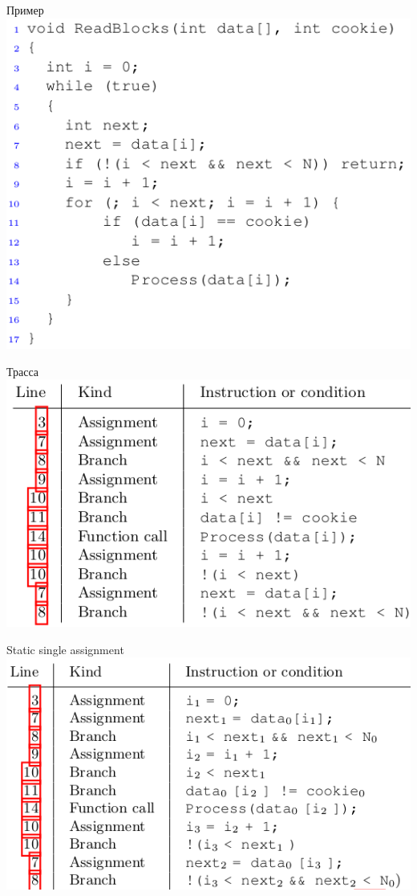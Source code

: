\documentclass{beamer}
\begin{document}
\begin{frame}{Пример}
\includegraphics[scale=0.5]{example1.png}
\end{frame}

\begin{frame}{Трасса}
\includegraphics[scale=0.5]{trace1.png}
\end{frame}

\begin{frame}{Static single assignment}
\includegraphics[scale=0.5]{static_single_assignment.png}
\end{frame}
\end{document}

